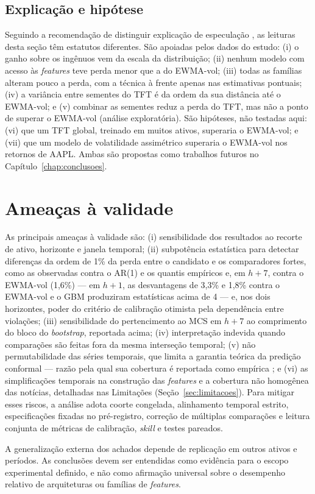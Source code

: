 \subsection{Explicação e hipótese}
Seguindo a recomendação de distinguir explicação de especulação \cite{LIPTON2019}, as leituras desta seção têm estatutos diferentes. São apoiadas pelos dados do estudo: (i) o ganho sobre os ingênuos vem da escala da distribuição; (ii) nenhum modelo com acesso às \textit{features} teve perda menor que a do EWMA-vol; (iii) todas as famílias alteram pouco a perda, com a técnica à frente apenas nas estimativas pontuais; (iv) a variância entre sementes do TFT é da ordem da sua distância até o EWMA-vol; e (v) combinar as sementes reduz a perda do TFT, mas não a ponto de superar o EWMA-vol (análise exploratória). São hipóteses, não testadas aqui: (vi) que um TFT global, treinado em muitos ativos, superaria o EWMA-vol; e (vii) que um modelo de volatilidade assimétrico superaria o EWMA-vol nos retornos de AAPL. Ambas são propostas como trabalhos futuros no Capítulo~\ref{chap:conclusoes}.

\section{Ameaças à validade}
As principais ameaças à validade são: (i) sensibilidade dos resultados ao recorte de ativo, horizonte e janela temporal; (ii) subpotência estatística para detectar diferenças da ordem de 1\% da perda entre o candidato e os comparadores fortes, como as observadas contra o AR(1) e os quantis empíricos e, em \(h+7\), contra o EWMA-vol (1,6\%) --- em \(h+1\), as desvantagens de 3,3\% e 1,8\% contra o EWMA-vol e o GBM produziram estatísticas acima de 4 --- e, nos dois horizontes, poder do critério de calibração otimista pela dependência entre violações; (iii) sensibilidade do pertencimento ao MCS em \(h+7\) ao comprimento do bloco do \textit{bootstrap}, reportada acima; (iv) interpretação indevida quando comparações são feitas fora da mesma interseção temporal; (v) não permutabilidade das séries temporais, que limita a garantia teórica da predição conformal --- razão pela qual sua cobertura é reportada como empírica \cite{BARBER2023}; e (vi) as simplificações temporais na construção das \textit{features} e a cobertura não homogênea das notícias, detalhadas nas Limitações (Seção~\ref{sec:limitacoes}). Para mitigar esses riscos, a análise adota coorte congelada, alinhamento temporal estrito, especificações fixadas no pré-registro, correção de múltiplas comparações e leitura conjunta de métricas de calibração, \textit{skill} e testes pareados.

A generalização externa dos achados depende de replicação em outros ativos e períodos. As conclusões devem ser entendidas como evidência para o escopo experimental definido, e não como afirmação universal sobre o desempenho relativo de arquiteturas ou famílias de \textit{features}.
